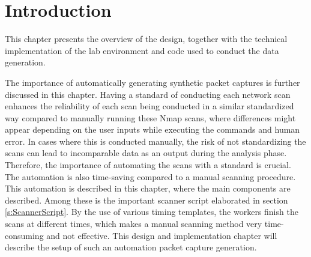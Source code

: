 \section{Introduction}
\label{s:DesignImplementationIntroduction}
This chapter presents the overview of the design, together with the technical implementation of the lab environment and code used to conduct the data generation.

The importance of automatically generating synthetic packet captures is further discussed in this chapter.
Having a standard of conducting each network scan enhances the reliability of each scan being conducted in a similar standardized way compared to manually running these Nmap scans, where differences might appear depending on the user inputs while executing the commands and human error.
In cases where this is conducted manually, the risk of not standardizing the scans can lead to incomparable data as an output during the analysis phase.
Therefore, the importance of automating the scans with a standard is crucial. The automation is also time-saving compared to a manual scanning procedure.
This automation is described in this chapter, where the main components are described. Among these is the important scanner script elaborated in section \ref{s:ScannerScript}.
By the use of various timing templates, the workers finish the scans at different times, which makes a manual scanning method very time-consuming and not effective. This design and implementation chapter will describe the setup of such an automation packet capture generation.
